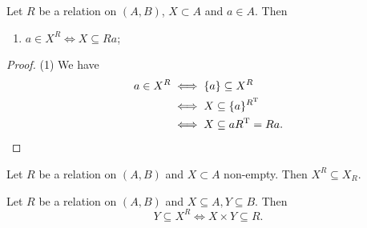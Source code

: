 \begin{lemma}
Let $R$ be a relation on $(A, B)$, $X\subset A$ and $a\in A$. Then
\begin{enumerate}
\item $a\in X^R \iff X \subseteq Ra$;
\end{enumerate}
\end{lemma}
\begin{proof}
(1) We have
\begin{align*}
a\in X^R &\iff \{a\} \subseteq X^R \\
&\iff X \subseteq \{a\}^{R^{\mathrm{T}}} \\
&\iff X \subseteq a{R^{\mathrm{T}}} = Ra.
\end{align*}
\end{proof}

\begin{lemma} \label{polarSubsetImage}
Let $R$ be a relation on $(A, B)$ and $X\subset A$ non-empty. Then $X^R \subseteq X_R$.
\end{lemma}

\begin{lemma} \label{polarsCartesianProduct}
Let $R$ be a relation on $(A,B)$ and $X\subseteq A, Y\subseteq B$. Then
\[ Y\subseteq X^R \iff X\times Y \subseteq R. \]
\end{lemma}

